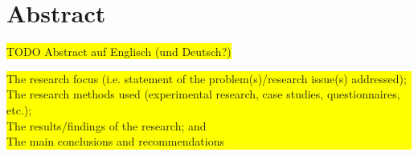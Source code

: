 \section{Abstract}

\colorbox{yellow}{TODO Abstract auf Englisch (und Deutsch?)}

\colorbox{yellow}{\parbox{\textwidth}{
The research focus (i.e. statement of the problem(s)/research issue(s) addressed);\\
The research methods used (experimental research, case studies, questionnaires, etc.);\\
The results/findings of the research; and\\
The main conclusions and recommendations
}}
